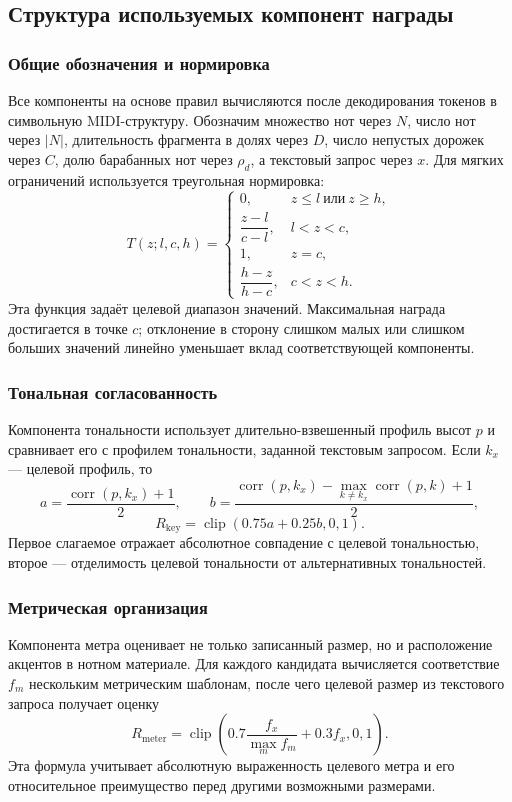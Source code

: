 \documentclass[a4paper,12pt]{extarticle}
\begin{document}
\subsection{Структура используемых компонент награды}

\subsubsection{Общие обозначения и нормировка}

Все компоненты на основе правил вычисляются после декодирования токенов в
символьную MIDI-структуру. Обозначим множество нот через $N$, число нот
через $|N|$, длительность фрагмента в долях через $D$, число непустых
дорожек через $C$, долю барабанных нот через $\rho_d$, а текстовый
запрос через $x$. Для мягких ограничений используется треугольная
нормировка:
\[
T(z;l,c,h)=
\begin{cases}
0, & z\le l \ \text{или}\ z\ge h,\\
\dfrac{z-l}{c-l}, & l<z<c,\\
1, & z=c,\\
\dfrac{h-z}{h-c}, & c<z<h.
\end{cases}
\]
Эта функция задаёт целевой диапазон значений. Максимальная награда
достигается в точке $c$; отклонение в сторону слишком малых или слишком
больших значений линейно уменьшает вклад соответствующей компоненты.

\subsubsection{Тональная согласованность}

Компонента тональности использует длительно-взвешенный профиль высот
$p$ и сравнивает его с профилем тональности, заданной текстовым
запросом. Если $k_x$ --- целевой профиль, то
\[
a=\frac{\operatorname{corr}(p,k_x)+1}{2}, \qquad
b=\frac{\operatorname{corr}(p,k_x)-\max_{k\ne k_x}\operatorname{corr}(p,k)+1}{2},
\]
\[
R_{\mathrm{key}}=\operatorname{clip}(0.75a+0.25b,0,1).
\]
Первое слагаемое отражает абсолютное совпадение с целевой тональностью,
второе --- отделимость целевой тональности от альтернативных
тональностей.

\subsubsection{Метрическая организация}

Компонента метра оценивает не только записанный размер, но и
расположение акцентов в нотном материале. Для каждого кандидата
вычисляется соответствие $f_m$ нескольким метрическим шаблонам, после
чего целевой размер из текстового запроса получает оценку
\[
R_{\mathrm{meter}}=
\operatorname{clip}\!\left(0.7\frac{f_x}{\max_m f_m}+0.3f_x,0,1\right).
\]
Эта формула учитывает абсолютную выраженность целевого метра и его
относительное преимущество перед другими возможными размерами.
\end{document}
